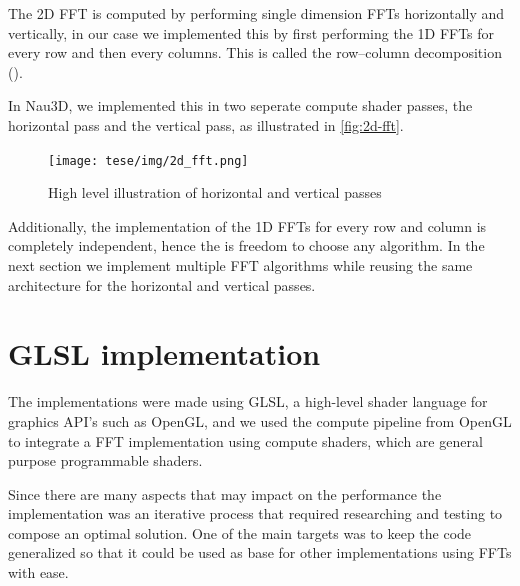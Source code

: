 \documentclass[
  oneside,
  11pt, a4paper,
  footinclude=true,
  headinclude=true,
  cleardoublepage=empty
]{scrbook}
\begin{document}

The 2D FFT is computed by performing single dimension FFTs horizontally and vertically, in our case we implemented this by first performing the 1D FFTs for every row and then every columns. This is called the row–column decomposition (\cite{mermer2003efficient}).

In Nau3D, we implemented this in two seperate compute shader passes, the horizontal pass and the vertical pass, as illustrated in \autoref{fig:2d-fft}.


\begin{figure}[H]
    \centering
    \texttt{[image: tese/img/2d\_fft.png]}
    \caption{High level illustration of horizontal and vertical passes}
    \label{fig:2d-fft}
\end{figure}

Additionally, the implementation of the 1D FFTs for every row and column is completely independent, hence the is freedom to choose any algorithm. In the next section we implement multiple FFT algorithms while reusing the same architecture for the horizontal and vertical passes.


\section{GLSL implementation} \label{sec:glsl-implementation}

The implementations were made using GLSL, a high-level shader language for graphics API's such as OpenGL, and we used the compute pipeline from OpenGL to integrate a FFT implementation using compute shaders, which are general purpose programmable shaders.

Since there are many aspects that may impact on the performance the implementation was an iterative process that required researching and testing to compose an optimal solution. One of the main targets was to keep the code generalized so that it could be used as base for other implementations using FFTs with ease.
\newline
\end{document}
